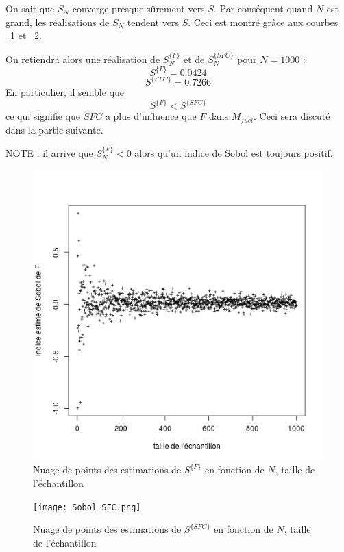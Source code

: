 \documentclass{article}
\begin{document}
On sait que $S_N$ converge presque sûrement vers $S$. Par conséquent quand $N$ est grand, les réalisations de $S_N$ tendent vers $S$. Ceci est montré grâce aux courbes ~\ref{sobol_F} et ~\ref{sobol_SFC}. 

On retiendra alors une réalisation de $S^{\{F\}}_{N}$ et de $S^{\{SFC\}}_{N}$ pour $N=1000$ :
\[S^{\{F\}}=0.0424\]
\[S^{\{SFC\}}=0.7266\]
En particulier, il semble que 
\[S^{\{F\}} < S^{\{SFC\}}\]
ce qui signifie que $SFC$ a plus d'influence que $F$ dans $M_{fuel}$. Ceci sera discuté dans la partie suivante.

NOTE : il arrive que $S^{\{F\}}_{N} < 0$ alors qu'un indice de Sobol est toujours positif. 

\begin{figure}[!h]
\begin{center}
    \includegraphics[scale=0.7]{Sobol_F.png}
    \caption{Nuage de points des estimations de $S^{\{F\}}$ en fonction de $N$, taille de l'échantillon}
    \label{sobol_F}
\end{center}
\end{figure}
\begin{figure}[!h]
\begin{center}
    \texttt{[image: Sobol\_SFC.png]}
    \caption{Nuage de points des estimations de $S^{\{SFC\}}$ en fonction de $N$, taille de l'échantillon}
    \label{sobol_SFC}
\end{center}
\end{figure}
\end{document}
